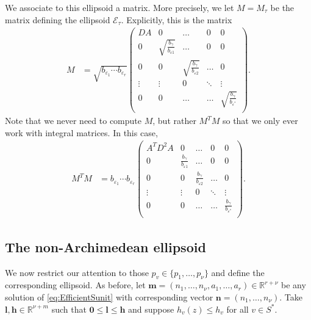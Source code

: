 \documentclass[11pt]{report}
\theoremstyle{definition}
\begin{document}
We associate to this ellipsoid a matrix. More precisely, we let $M=M_\tau$ be the matrix defining the ellipsoid $\mathcal{E}_{\tau}$. Explicitly, this is the matrix
\begin{align*}
M &=\sqrt{b_{\varepsilon_1}\cdots b_{\varepsilon_r}}\begin{pmatrix}
	DA & 0 & \dots & 0 & 0\\
	0 & \sqrt{\frac{b_{\gamma}}{b_{\varepsilon 1}}} & \dots & 0 & 0\\
	0 & 0  & \sqrt{\frac{b_{\gamma}}{b_{\varepsilon 2}}} & \dots & 0\\
	\vdots & \vdots &0 &  \ddots & \vdots\\
	0 & 0 & \dots & \dots & \sqrt{\frac{b_{\gamma}}{b_{\varepsilon^*}}} \\
	\end{pmatrix}.
\end{align*}
Note that we never need to compute $M$, but rather $M^TM$ so that we only ever work with integral matrices. In this case,
\begin{align*}
M^TM &= b_{\varepsilon_1}\cdots b_{\varepsilon_r}\begin{pmatrix}
	A^TD^2A & 0 & \dots & 0 & 0\\
	0 & \frac{b_{\gamma}}{b_{\varepsilon 1}} & \dots & 0 & 0\\
	0 & 0  & \frac{b_{\gamma}}{b_{\varepsilon 2}} & \dots & 0\\
	\vdots & \vdots &0 &  \ddots & \vdots\\
	0 & 0 & \dots & \dots & \frac{b_{\gamma}}{b_{\varepsilon^*}} \\
	\end{pmatrix}.
\end{align*}


\subsection{The non-Archimedean ellipsoid}
\label{subsec:nonArchEllipsoid}

We now restrict our attention to those $p_v \in \{p_1, \dots, p_{\nu}\}$ and define the corresponding ellipsoid. As before, let $\mathbf{m} = (n_1, \dots, n_{\nu}, a_1, \dots, a_r) \in \mathbb{R}^{r + \nu}$ be any solution of \eqref{eq:EfficientSunit} with corresponding vector $\mathbf{n} = (n_1, \dots, n_{\nu})$. Take $\mathbf{l},\mathbf{h}\in\mathbb{R}^{\nu+m}$ such that $\mathbf{0} \leq \mathbf{l} \leq \mathbf{h}$ and suppose $h_v(z)\leq h_v$ for all $v\in S^*$.
\end{document}
